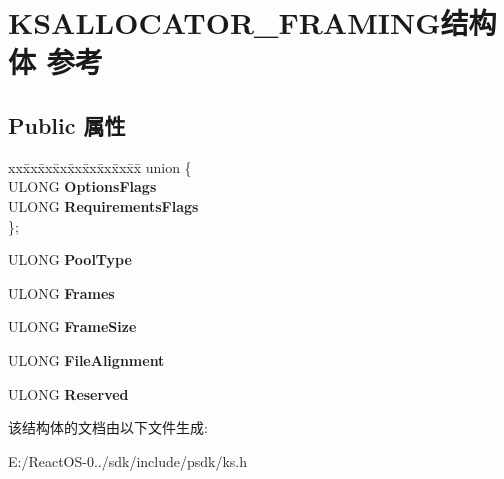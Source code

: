 \hypertarget{struct_k_s_a_l_l_o_c_a_t_o_r___f_r_a_m_i_n_g}{}\section{K\+S\+A\+L\+L\+O\+C\+A\+T\+O\+R\+\_\+\+F\+R\+A\+M\+I\+N\+G结构体 参考}
\label{struct_k_s_a_l_l_o_c_a_t_o_r___f_r_a_m_i_n_g}
\subsection*{Public 属性}
\begin{DoxyCompactItemize}
\item 
\mbox{\label{struct_k_s_a_l_l_o_c_a_t_o_r___f_r_a_m_i_n_g_ab1d604365643d4fdd5ea8ada41ab4b7a}} 
\begin{tabbing}
xx\=xx\=xx\=xx\=xx\=xx\=xx\=xx\=xx\=\kill
union \{\\
\>ULONG {\bfseries OptionsFlags}\\
\>ULONG {\bfseries RequirementsFlags}\\
\}; \\

\end{tabbing}\item 
\mbox{\label{struct_k_s_a_l_l_o_c_a_t_o_r___f_r_a_m_i_n_g_a01b76130facc528cfb7319c9b6f938f4}} 
U\+L\+O\+NG {\bfseries Pool\+Type}
\item 
\mbox{\label{struct_k_s_a_l_l_o_c_a_t_o_r___f_r_a_m_i_n_g_aa25e20017444ced6d4d6fe1e4279ffb4}} 
U\+L\+O\+NG {\bfseries Frames}
\item 
\mbox{\label{struct_k_s_a_l_l_o_c_a_t_o_r___f_r_a_m_i_n_g_afdba87342998933c95bde99a49d44766}} 
U\+L\+O\+NG {\bfseries Frame\+Size}
\item 
\mbox{\label{struct_k_s_a_l_l_o_c_a_t_o_r___f_r_a_m_i_n_g_ae0f7fcded8d4244e4287f9d90fa9f34c}} 
U\+L\+O\+NG {\bfseries File\+Alignment}
\item 
\mbox{\label{struct_k_s_a_l_l_o_c_a_t_o_r___f_r_a_m_i_n_g_a55979a49c3e1b4e3cd5936a1b51e056e}} 
U\+L\+O\+NG {\bfseries Reserved}
\end{DoxyCompactItemize}


该结构体的文档由以下文件生成\+:\begin{DoxyCompactItemize}
\item 
E\+:/\+React\+O\+S-\/0../sdk/include/psdk/ks.\+h\end{DoxyCompactItemize}
